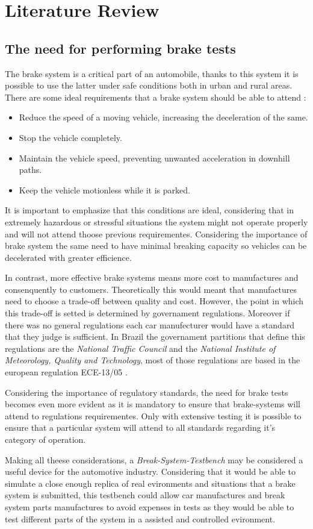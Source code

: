 \chapter{Literature Review}

	\section{The need for performing brake tests}
		The brake system is a critical part of an automobile, thanks to this system it is possible to use the latter under safe conditions both in urban and rural areas. There are some ideal requirements that a brake system should be able to attend \cite{kawaguchi} :

		\begin{itemize}
			\item Reduce the speed of a moving vehicle, increasing the deceleration of the same.
			\item Stop the vehicle completely.
			\item Maintain the vehicle speed, preventing unwanted acceleration in downhill paths.
			\item Keep the vehicle motionless while it is parked.
		\end{itemize}

		It is important to emphasize that this conditions are ideal, considering that in extremely hazardous or stressful situations the system might not operate properly and will not attend thoose previous requirementes. Considering the importance of brake system the same need to have minimal breaking capacity so vehicles can be decelerated with greater efficience. 
		\par
		In contrast, more effective brake systems means more cost to manufactures and consenquently to customers. Theoretically this would meant that manufactures need to choose a trade-off between quality and cost. However, the point in which this trade-off is setted is determined by governament regulations. Moreover if there was no general regulations each car manufecturer would have a standard that they judge is sufficient. In Brazil the governament partitions that define this regulations are the \textit{National Traffic Council} and the \textit{National Institute of Meteorology, Quality and Technology}, most of those regulations are based in the european regulation ECE-13/05 \cite{inmetro2013} .
		\par
		Considering the importance of regulatory standards, the need for brake tests becomes even more evident as it is mandatory to ensure that brake-systems will attend to regulations requirementes. Only with extensive testing it is possible to ensure that a particular system will attend to all standards regarding it's category of operation. 
		\par
		Making all theese considerations, a \textit{Break-System-Testbench} may be considered a useful device for the automotive industry. Considering that it would be able to simulate a close enough replica of real evironments and situations that a brake system is submitted, this testbench could allow car manufactures and break system parts manufactures to avoid expenses in tests as they would be able to test different parts of the system in a assisted and controlled evironment.

